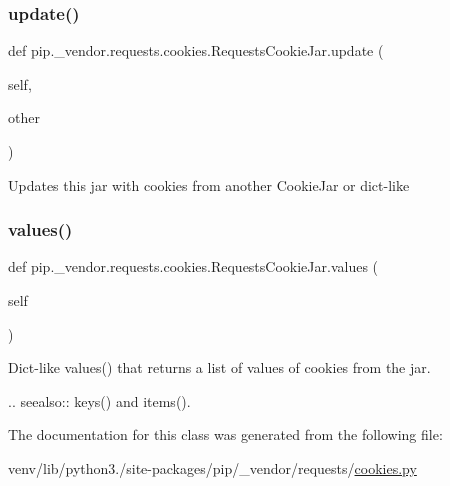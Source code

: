 \mbox{\label{classpip_1_1__vendor_1_1requests_1_1cookies_1_1RequestsCookieJar_acd672e26f44f92529802c10e4211eee2}} 
\subsubsection{\texorpdfstring{update()}{update()}}
{\footnotesize\ttfamily def pip.\+\_\+vendor.\+requests.\+cookies.\+Requests\+Cookie\+Jar.\+update (\begin{DoxyParamCaption}\item[{}]{self,  }\item[{}]{other }\end{DoxyParamCaption})}

\begin{DoxyVerb}Updates this jar with cookies from another CookieJar or dict-like\end{DoxyVerb}
 \mbox{\label{classpip_1_1__vendor_1_1requests_1_1cookies_1_1RequestsCookieJar_ab1664c19386b98ad1335989e85f40ce0}} 
\subsubsection{\texorpdfstring{values()}{values()}}
{\footnotesize\ttfamily def pip.\+\_\+vendor.\+requests.\+cookies.\+Requests\+Cookie\+Jar.\+values (\begin{DoxyParamCaption}\item[{}]{self }\end{DoxyParamCaption})}

\begin{DoxyVerb}Dict-like values() that returns a list of values of cookies from the
jar.

.. seealso:: keys() and items().
\end{DoxyVerb}
 

The documentation for this class was generated from the following file\+:\begin{DoxyCompactItemize}
\item 
venv/lib/python3./site-\/packages/pip/\+\_\+vendor/requests/\hyperlink{cookies_8py}{cookies.\+py}\end{DoxyCompactItemize}
